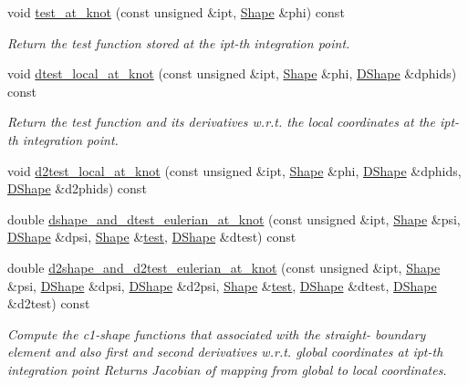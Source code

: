 \begin{DoxyCompactItemize}
\item 
void \hyperlink{classoomph_1_1C1CurvedElementBase_ab259c76f5ec2f076324127a7e64cccc3}{test\+\_\+at\+\_\+knot} (const unsigned \&ipt, \hyperlink{classoomph_1_1Shape}{Shape} \&phi) const
\begin{DoxyCompactList}\small\item\em Return the test function stored at the ipt-\/th integration point. \end{DoxyCompactList}\item 
void \hyperlink{classoomph_1_1C1CurvedElementBase_a5fcabaae9a008bf601ed01b81e2ee735}{dtest\+\_\+local\+\_\+at\+\_\+knot} (const unsigned \&ipt, \hyperlink{classoomph_1_1Shape}{Shape} \&phi, \hyperlink{classoomph_1_1DShape}{D\+Shape} \&dphids) const
\begin{DoxyCompactList}\small\item\em Return the test function and its derivatives w.\+r.\+t. the local coordinates at the ipt-\/th integration point. \end{DoxyCompactList}\item 
void \hyperlink{classoomph_1_1C1CurvedElementBase_a2134f74d95690ebefe22339cd0041a8e}{d2test\+\_\+local\+\_\+at\+\_\+knot} (const unsigned \&ipt, \hyperlink{classoomph_1_1Shape}{Shape} \&phi, \hyperlink{classoomph_1_1DShape}{D\+Shape} \&dphids, \hyperlink{classoomph_1_1DShape}{D\+Shape} \&d2phids) const
\item 
double \hyperlink{classoomph_1_1C1CurvedElementBase_a6411596e17d98cdd0691b6de6e5319d5}{dshape\+\_\+and\+\_\+dtest\+\_\+eulerian\+\_\+at\+\_\+knot} (const unsigned \&ipt, \hyperlink{classoomph_1_1Shape}{Shape} \&psi, \hyperlink{classoomph_1_1DShape}{D\+Shape} \&dpsi, \hyperlink{classoomph_1_1Shape}{Shape} \&\hyperlink{classoomph_1_1C1CurvedElementBase_aa953e1d89a6c059ac89c972feb0aea74}{test}, \hyperlink{classoomph_1_1DShape}{D\+Shape} \&dtest) const
\item 
double \hyperlink{classoomph_1_1C1CurvedElementBase_a758d1f61da5c350b194b3421d30f394d}{d2shape\+\_\+and\+\_\+d2test\+\_\+eulerian\+\_\+at\+\_\+knot} (const unsigned \&ipt, \hyperlink{classoomph_1_1Shape}{Shape} \&psi, \hyperlink{classoomph_1_1DShape}{D\+Shape} \&dpsi, \hyperlink{classoomph_1_1DShape}{D\+Shape} \&d2psi, \hyperlink{classoomph_1_1Shape}{Shape} \&\hyperlink{classoomph_1_1C1CurvedElementBase_aa953e1d89a6c059ac89c972feb0aea74}{test}, \hyperlink{classoomph_1_1DShape}{D\+Shape} \&dtest, \hyperlink{classoomph_1_1DShape}{D\+Shape} \&d2test) const
\begin{DoxyCompactList}\small\item\em Compute the c1-\/shape functions that associated with the straight-\/ boundary element and also first and second derivatives w.\+r.\+t. global coordinates at ipt-\/th integration point Returns Jacobian of mapping from global to local coordinates. \end{DoxyCompactList}\item 

\end{DoxyCompactItemize}
